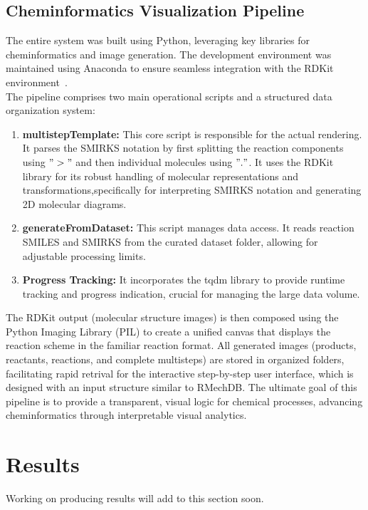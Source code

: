 \documentclass[12pt]{article}
\begin{document}
\subsection{Cheminformatics Visualization Pipeline}
The entire system was built using Python, leveraging key libraries for cheminformatics and image generation.
The development environment was maintained using Anaconda to ensure seamless integration with the RDKit environment~\cite{rdkit2025overview}.
\\
The pipeline comprises two main operational scripts and a structured data organization system:
\begin{enumerate}
    \item \textbf{multistepTemplate:} This core script is responsible for the actual rendering. It parses the SMIRKS notation by first splitting the reaction components using $">"$ and then individual molecules using $"."$. It uses the RDKit library for its robust handling of molecular representations and transformations,specifically for interpreting SMIRKS notation and generating 2D molecular diagrams.
    \item \textbf{generateFromDataset:} This script manages data access. It reads reaction SMILES and SMIRKS from the curated dataset folder, allowing for adjustable processing limits.
    \item \textbf{Progress Tracking:} It incorporates the tqdm library to provide runtime tracking and progress indication, crucial for managing the large data volume.
\end{enumerate}
The RDKit output (molecular structure images) is then composed using the Python Imaging Library (PIL) to create a unified canvas that displays the reaction scheme in the familiar reaction format.
All generated images (products, reactants, reactions, and complete multisteps) are stored in organized folders, facilitating rapid retrival for the interactive step-by-step user interface, which is designed with an input structure similar to RMechDB.
The ultimate goal of this pipeline is to provide a transparent, visual logic for chemical processes, advancing cheminformatics through interpretable visual analytics.



\section{Results}
\noindent
Working on producing results will add to this section soon.
\end{document}
